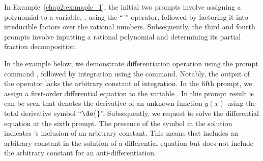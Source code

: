 %
In Example~\ref{chap2:ex:maple_1}, the initial two prompts involve assigning a polynomial to a variable, , using the ``'\code{:=}'' operator, followed by factoring it into irreducible factors over the rational numbers. Subsequently, the third and fourth prompts involve inputting a rational polynomial and determining its partial fraction decomposition.

In the example below, we demonstrate differentiation operation using the prompt command , followed by integration using the  command. Notably, the output of the  operator lacks the arbitrary constant of integration. In the fifth prompt, we assign a first-order differential equation to the variable . In this prompt result is can be seen that \Maple{} denotes the derivative of an unknown function $y(x)$ using the total derivative symbol ``$\de{}$''. Subsequently, we request \Maple{} to solve the differential equation at the sixth prompt. The presence of the symbol  in the solution indicates \Maple{}'s inclusion of an arbitrary constant. This means that \Maple{} includes an arbitrary constant in the solution of a differential equation but does not include the arbitrary constant for an anti-differentiation.
%
